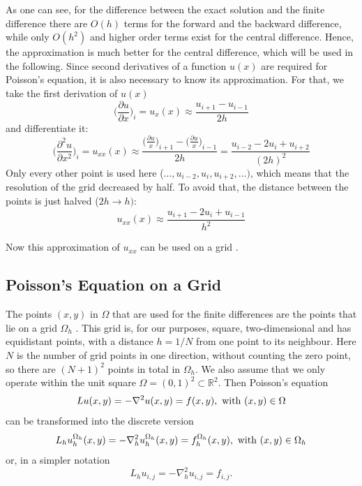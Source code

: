 As one can see, for the difference between the exact solution and the finite difference there are $O(h)$ terms for the forward and the backward difference, while only $O(h^2)$ and higher order terms exist for the central difference. Hence, the approximation is much better for the central difference, which will be used in the following. Since second derivatives of a function $u(x)$ are required for Poisson's equation, it is also necessary to know its approximation. For that, we take the first derivation of $u(x)$
\begin{equation}
 \Big(\frac{\partial u}{\partial x}\Big)_i = u_x(x) \approx    \frac{u_{i+1} - u_{i-1}}{2h}
\end{equation}
and differentiate it:
\begin{equation}
\Big(\frac{\partial^2 u}{\partial x^2}\Big)_i = u_{xx}(x) \approx   \frac{\big(\frac{\partial u}{x}\big)_{i+1}   -  \big(\frac{\partial u}{x}\big)_{i-1}  }{2h} = \frac{u_{i-2} - 2u_i + u_{i+2}}{(2h)^2} 
\end{equation}
Only every other point is used here ($\hdots, u_{i-2}, u_i, u_{i+2}, \hdots)$, which means that the resolution of the grid decreased by half. To avoid that, the distance between the points is just halved ($2h \rightarrow h)$: 
\begin{equation}
u_{xx}(x) \approx \frac{u_{i+1} - 2u_i + u_{i-1}}{h^2} 
\label{equ:uxx}
\end{equation}

Now this approximation of $u_{xx}$ can be used on a grid \cite{langer}. 

\subsection{Poisson's Equation on a Grid}
The points $(x,y)$ in $\Omega$ that are used for the finite differences are the points that lie on a grid $\Omega_h$ \cite{Trottenberg:2000:MUL:374106}. This grid is, for our purposes, square, two-dimensional and has equidistant points, with a distance $h = 1/N$ from one point to its neighbour. Here $N$ is the number of grid points in one direction, without counting the zero point, so there are $(N+1)^2$ points in total in $\Omega_h$. We also assume that we only operate within the unit square $\Omega = (0,1)^2 \subset \mathbb{R}^2$. Then Poisson's equation
\begin{equation}
L u(x,y) = -\nabla^2 u(x,y) = f(x,y), \textnormal{ with } (x,y) \in \Omega
\end{equation}
can be transformed into the discrete version
\begin{equation}
L_h u^{\Omega_h}_h(x,y) = -\nabla^2_h u^{\Omega_h}_h (x,y) = f^{\Omega_h}_h(x,y), \textnormal{ with } (x,y) \in \Omega_h
\end{equation}
or, in a simpler notation
\begin{equation}
L_h u_{i,j} = -\nabla^2_h u_{i,j} = f_{i,j}.
\end{equation}


